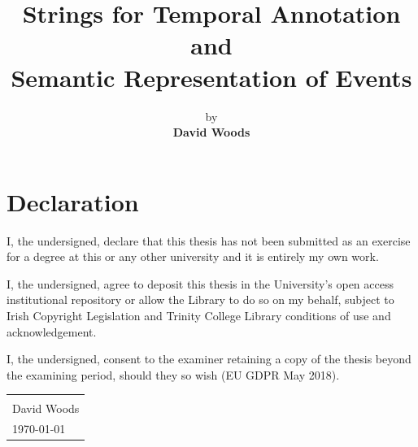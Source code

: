 \documentclass[a4paper,12pt,leqno]{article}
\title{\textbf{Strings for Temporal Annotation and\\Semantic Representation of Events}}
\author{by\\{\textbf{David Woods}}\bigskip\bigskip}
\date{\parbox{\linewidth}{\centering%
		{\large A dissertation submitted\\in fulfillment of the requirements\\for the Degree of\\\textbf{Doctor of Philosophy}}\\		
		\bigskip\bigskip\bigskip
		{\Large \textbf{University of Dublin, Trinity College}}\\\endgraf \monthyeardate\today}{\small \vspace{\fill} Supervised by: Dr Tim Fernando, Dr Carl Vogel}}
\begin{document}
\maketitle
\thispagestyle{empty}

\newpage
{}
\section*{Declaration}
\noindent
I, the undersigned, declare that this thesis has not been submitted as an exercise for a degree at this or any other university and it is entirely my own work.\par

\vspace{2em}

\noindent
I, the undersigned, agree to deposit this thesis in the University's open access institutional repository or allow the Library to do so on my behalf, subject to Irish Copyright Legislation and Trinity College Library conditions of use and acknowledgement.\par

\vspace{2em}

\noindent
I, the undersigned, consent to the examiner retaining a copy of the thesis beyond the examining period, should they so wish (EU GDPR May 2018).

\vspace{\fill}

\begin{table}[!htbp]
	\flushright
	\begin{tabular}{l}
		\makebox[10cm]{\hrulefill}\\[0.5cm]
		David Woods\\[0.25cm]
		{\monthyeardate\today}
	\end{tabular}
\end{table}

\vspace{5em}

\newpage
\begin{abstract}
\noindent
\end{abstract}
\end{document}
